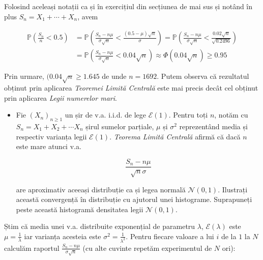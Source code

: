 \documentclass[
]{article}
\newenvironment{frshaded*}{%
  \def\FrameCommand{\fboxrule=\FrameRule\fboxsep=\FrameSep \fcolorbox{framecolor}{shadecolor1}}%
  \MakeFramed {\advance\hsize-\width \FrameRestore}}%
{\endMakeFramed}
\newenvironment{rmdblock}[1]
  {\begin{frshaded*}
  \begin{itemize}
  \renewcommand{\labelitemi}{
    \raisebox{-.7\height}[0pt][0pt]{
      {\setkeys{Gin}{width=2em,keepaspectratio}\texttt{[image: images/icons/\#1]}}
    }
  }
  \item
  }
  {
  \end{itemize}
  \end{frshaded*}
  }
\newenvironment{rmdexercise}
  {\begin{rmdblock}{exercise}}
  {\end{rmdblock}}
\begin{document}
Folosind aceleași notații ca și în exercițiul din secțiunea de mai sus
și notând în plus \(S_n = X_1+\cdots+X_n\), avem

\begin{align*}
  \mathbb{P}\left(\frac{S_n}{n}<0.5\right) &= \mathbb{P}\left(\frac{S_n - n\mu}{\sigma\sqrt{n}}<\frac{(0.5-\mu)\sqrt{n}}{\sigma}\right)= \mathbb{P}\left(\frac{S_n - n\mu}{\sigma\sqrt{n}}<\frac{0.02\sqrt{n}}{\sqrt{0.2496}}\right) \\
  &= \mathbb{P}\left(\frac{S_n - n\mu}{\sigma\sqrt{n}}<0.04\sqrt{n}\right) \approx\Phi(0.04\sqrt{n})\geq 0.95
\end{align*}

Prin urmare, \((0.04\sqrt{n}\geq 1.645\) de unde \(n = 1692\). Putem
observa că rezultatul obținut prin aplicarea \emph{Teoremei Limită
Centrală} este mai precis decât cel obținut prin aplicarea \emph{Legii
numerelor mari}.

\begin{rmdexercise}
Fie \((X_n)_{n\geq1}\) un șir de v.a. i.i.d. de lege \(\mathcal{E}(1)\).
Pentru toți \(n\), notăm cu \(S_n=X_1+X_2+\cdots X_n\) șirul sumelor
parțiale, \(\mu\) și \(\sigma^2\) reprezentând media și respectiv
varianța legii \(\mathcal{E}(1)\). \emph{Teorema Limită Centrală} afirmă
că dacă \(n\) este mare atunci v.a.

\[
\frac{S_n-n\mu}{\sqrt{n}\sigma}
\]

are aproximativ aceeași distribuție ca și legea normală
\(\mathcal{N}(0,1)\). Ilustrați această convergență în distribuție cu
ajutorul unei histograme. Suprapuneți peste această histogramă
densitatea legii \(\mathcal{N}(0,1)\).
\end{rmdexercise}

Știm că media unei v.a. distribuite exponențial de parametru
\(\lambda\), \(\mathcal{E}(\lambda)\) este \(\mu=\frac{1}{\lambda}\) iar
varianța acesteia este \(\sigma^2=\frac{1}{\lambda^2}\). Pentru fiecare
valoare a lui \(i\) de la \(1\) la \(N\) calculăm raportul
\(\frac{S_n-n\mu}{\sigma\sqrt{n}}\) (cu alte cuvinte repetăm
experimentul de \(N\) ori):
\end{document}
